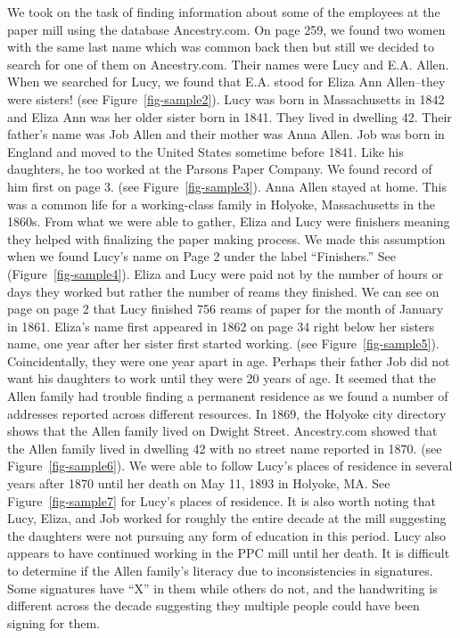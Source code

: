 \documentclass[
  letterpaper,
  DIV=11,
  numbers=noendperiod]{scrartcl}
\begin{document}
We took on the task of finding information about some of the employees
at the paper mill using the database Ancestry.com. On page 259, we found
two women with the same last name which was common back then but still
we decided to search for one of them on Ancestry.com. Their names were
Lucy and E.A. Allen. When we searched for Lucy, we found that E.A. stood
for Eliza Ann Allen--they were sisters! (see Figure~\ref{fig-sample2}).
Lucy was born in Massachusetts in 1842 and Eliza Ann was her older
sister born in 1841. They lived in dwelling 42. Their father's name was
Job Allen and their mother was Anna Allen. Job was born in England and
moved to the United States sometime before 1841. Like his daughters, he
too worked at the Parsons Paper Company. We found record of him first on
page 3. (see Figure~\ref{fig-sample3}). Anna Allen stayed at home. This
was a common life for a working-class family in Holyoke, Massachusetts
in the 1860s. From what we were able to gather, Eliza and Lucy were
finishers meaning they helped with finalizing the paper making process.
We made this assumption when we found Lucy's name on Page 2 under the
label ``Finishers.'' See (Figure~\ref{fig-sample4}). Eliza and Lucy were
paid not by the number of hours or days they worked but rather the
number of reams they finished. We can see on page on page 2 that Lucy
finished 756 reams of paper for the month of January in 1861. Eliza's
name first appeared in 1862 on page 34 right below her sisters name, one
year after her sister first started working. (see
Figure~\ref{fig-sample5}). Coincidentally, they were one year apart in
age. Perhaps their father Job did not want his daughters to work until
they were 20 years of age. It seemed that the Allen family had trouble
finding a permanent residence as we found a number of addresses reported
across different resources. In 1869, the Holyoke city directory shows
that the Allen family lived on Dwight Street. Ancestry.com showed that
the Allen family lived in dwelling 42 with no street name reported in
1870. (see Figure~\ref{fig-sample6}). We were able to follow Lucy's
places of residence in several years after 1870 until her death on May
11, 1893 in Holyoke, MA. See Figure~\ref{fig-sample7} for Lucy's places
of residence. It is also worth noting that Lucy, Eliza, and Job worked
for roughly the entire decade at the mill suggesting the daughters were
not pursuing any form of education in this period. Lucy also appears to
have continued working in the PPC mill until her death. It is difficult
to determine if the Allen family's literacy due to inconsistencies in
signatures. Some signatures have ``X'' in them while others do not, and
the handwriting is different across the decade suggesting they multiple
people could have been signing for them.
\end{document}
